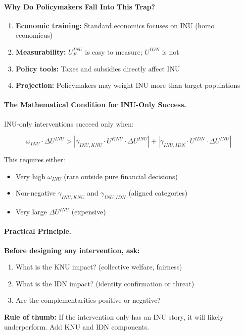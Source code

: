 \paragraph{Why Do Policymakers Fall Into This Trap?}

\begin{enumerate}
\item \textbf{Economic training:} Standard economics focuses on INU (homo economicus)
\item \textbf{Measurability:} $U^{INU}_F$ is easy to measure; $U^{IDN}$ is not
\item \textbf{Policy tools:} Taxes and subsidies directly affect INU
\item \textbf{Projection:} Policymakers may weight INU more than target populations
\end{enumerate}

\paragraph{The Mathematical Condition for INU-Only Success.}
INU-only interventions succeed only when:

\begin{equation}
\omega_{INU} \cdot \Delta U^{INU} > |\gamma_{INU,KNU} \cdot U^{KNU} \cdot \Delta U^{INU}| + |\gamma_{INU,IDN} \cdot U^{IDN} \cdot \Delta U^{INU}|
\end{equation}

This requires either:
\begin{itemize}
\item Very high $\omega_{INU}$ (rare outside pure financial decisions)
\item Non-negative $\gamma_{INU,KNU}$ and $\gamma_{INU,IDN}$ (aligned categories)
\item Very large $\Delta U^{INU}$ (expensive)
\end{itemize}

\paragraph{Practical Principle.}

\begin{tcolorbox}[colback=blue!5!white, colframe=blue!75!black, title=Principle 1: Beyond INU]
\textbf{Before designing any intervention, ask:}
\begin{enumerate}
\item What is the KNU impact? (collective welfare, fairness)
\item What is the IDN impact? (identity confirmation or threat)
\item Are the complementarities positive or negative?
\end{enumerate}
\textbf{Rule of thumb:} If the intervention only has an INU story, it will 
likely underperform. Add KNU and IDN components.
\end{tcolorbox}

